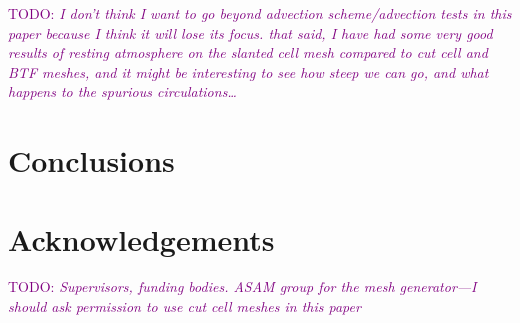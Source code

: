 \documentclass{article}
\newcommand{\TODO}[1]{\textcolor{purple}{TODO: \emph{#1}}}
\begin{document}
\TODO{I don't think I want to go beyond advection scheme/advection tests in this paper because I think it will lose its focus.  that said, I have had some very good results of resting atmosphere on the slanted cell mesh compared to cut cell and BTF meshes, and it might be interesting to see how steep we can go, and what happens to the spurious circulations\ldots}

\section{Conclusions}


\section{Acknowledgements}
\TODO{Supervisors, funding bodies.  ASAM group for the mesh generator---I should ask permission to use cut cell meshes in this paper}



\end{document}
